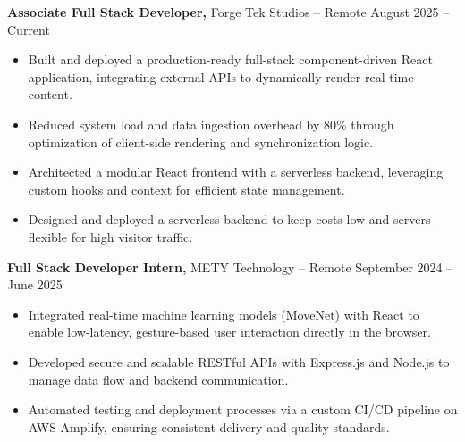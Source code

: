 \documentclass[11pt]{article}       %
\begin{document}
\textbf{Associate Full Stack Developer,} {Forge Tek Studios} -- Remote \hfill August 2025 -- Current 
\vspace{-9pt}
\begin{itemize}
  \item Built and deployed a production-ready full-stack component-driven React application, integrating external APIs to dynamically render real-time content.
  \item Reduced system load and data ingestion overhead by 80\% through optimization of client-side rendering and synchronization logic.
  \item Architected a modular React frontend with a serverless backend, leveraging custom hooks and context for efficient state management.
  \item Designed and deployed a serverless backend to keep costs low and servers flexible for high visitor traffic.
\end{itemize}

\textbf{Full Stack Developer Intern,} {METY Technology} -- Remote \hfill September 2024 -- June 2025 
\vspace{-9pt}
\begin{itemize}
  \item Integrated real-time machine learning models (MoveNet) with React to enable low-latency, gesture-based user interaction directly in the browser.
  \item Developed secure and scalable RESTful APIs with Express.js and Node.js to manage data flow and backend communication.
  \item Automated testing and deployment processes via a custom CI/CD pipeline on AWS Amplify, ensuring consistent delivery and quality standards.
\end{itemize}

\end{document}
